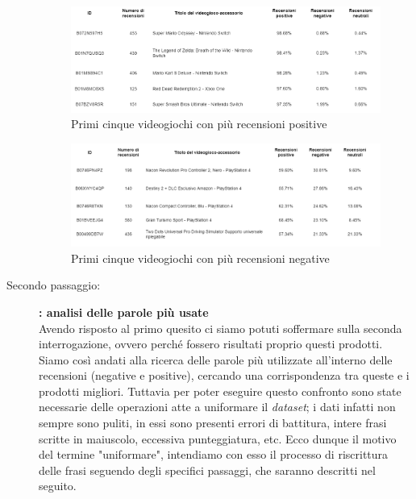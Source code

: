 \begin{description}
			\begin{figure} [h]
				\includegraphics[width=\textwidth]{Figure/top_pos_videogames_table}
				\caption{Primi cinque videogiochi con più recensioni positive}
				\label{fig:top_pos_videogames_table}
			\end{figure}
			
			\begin{figure} [h]
				\includegraphics[width=\textwidth]{Figure/top_neg_videogames_table}
				\caption{Primi cinque videogiochi con più recensioni negative}
				\label{fig:top_neg_videogames_table}
			\end{figure}
		
		\item [Secondo passaggio:] \textbf{: analisi delle parole più usate}\\
			Avendo risposto al primo quesito ci siamo potuti soffermare sulla seconda interrogazione, ovvero perché fossero risultati proprio questi prodotti. Siamo così andati alla ricerca delle parole più utilizzate all'interno delle recensioni (negative e positive), cercando una corrispondenza tra queste e i prodotti migliori. Tuttavia per poter eseguire questo confronto sono state necessarie delle operazioni atte a uniformare il \textit{dataset}; i dati infatti non sempre sono puliti, in essi sono presenti errori di battitura, intere frasi scritte in maiuscolo, eccessiva punteggiatura, etc. Ecco dunque il motivo del termine "uniformare", intendiamo con esso il processo di riscrittura delle frasi seguendo degli specifici passaggi, che saranno descritti nel seguito.
		

\end{description}
